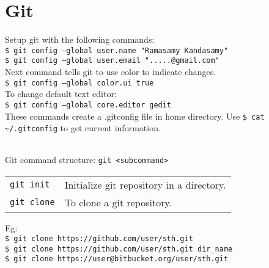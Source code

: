 \section{Git}


Setup git with the following commands:\\
\texttt{\$ git config --global user.name "Ramasamy Kandasamy"}\\
\texttt{\$ git config --global user.email ".....@gmail.com"}\\
Next command tells git to use color to indicate changes.\\
\texttt{\$ git config --global color.ui true}\\
To change default text editor:\\
\texttt{\$ git config --global core.editor gedit}\\
These commands create a .gitconfig file in home directory. Use \texttt{\$ cat \~{}/.gitconfig} to get current information.\\
\begin{tabularx}{\linewidth}{X}
\hline
\end{tabularx}


Git command structure: \texttt{git <subcommand>}
\begin{tabularx}{\linewidth}{lX}
\texttt{git init} & Initialize git repository in a directory.\\
\texttt{git clone} & To clone a git repository.\\ 
\end{tabularx}
Eg:\\
\texttt{\$ git clone https://github.com/user/sth.git}\\
\texttt{\$ git clone https://github.com/user/sth.git dir\_name}\\
\texttt{\$ git clone https://user@bitbucket.org/user/sth.git}\\
\begin{tabularx}{\linewidth}{X}
\hline 
\end{tabularx}


